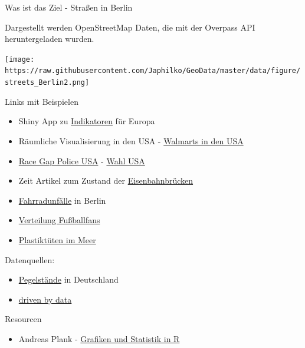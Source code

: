 \documentclass[ignorenonframetext,]{beamer}
\providecommand{\tightlist}{%
  \setlength{\itemsep}{0pt}\setlength{\parskip}{0pt}}
\begin{document}
\begin{frame}{Was ist das Ziel - Straßen in Berlin}
\protect\hypertarget{was-ist-das-ziel---straen-in-berlin}{}

Dargestellt werden OpenStreetMap Daten, die mit der Overpass API
heruntergeladen wurden.

\texttt{[image: https://raw.githubusercontent.com/Japhilko/GeoData/master/data/figure/streets\_Berlin2.png]}

\end{frame}

\begin{frame}{Links mit Beispielen}
\protect\hypertarget{links-mit-beispielen}{}

\begin{itemize}
\item
  Shiny App zu
  \href{https://japhilko.shinyapps.io/Choropleths/}{Indikatoren} für
  Europa
\item
  Räumliche Visualisierung in den USA -
  \href{https://rpubs.com/Radcliffe/walmart}{Walmarts in den USA}
\item
  \href{http://www.nytimes.com/interactive/2014/09/03/us/the-race-gap-in-americas-police-departments.html?_r=0}{Race
  Gap Police USA} - \href{http://fivethirtyeight.com/}{Wahl USA}
\item
  Zeit Artikel zum Zustand der
  \href{http://detektor.fm/digital/datenjournalismus-interaktive-karte-zeigt-marode-deutsche-bahn-bruecken}{Eisenbahnbrücken}
\item
  \href{http://michael-hoerz.de/maps/berlin-bike/}{Fahrradunfälle} in
  Berlin
\item
  \href{http://interaktiv.morgenpost.de/beta-fussballkarte/\#7/51.258/10.756}{Verteilung
  Fußballfans}
\item
  \href{http://news.nationalgeographic.com/news/2014/07/140715-ocean-plastic-debris-trash-pacific-garbage-patch/}{Plastiktüten
  im Meer}
\end{itemize}

Datenquellen:

\begin{itemize}
\tightlist
\item
  \href{https://www.pegelonline.wsv.de/gast/start}{Pegelstände} in
  Deutschland
\item
  \href{http://driven-by-data.net/}{driven by data}
\end{itemize}

Resourcen

\begin{itemize}
\tightlist
\item
  Andreas Plank -
  \href{http://www.chironomidaeproject.com/fileadmin/downloads/Formeln_in_R.pdf}{Grafiken
  und Statistik in R}
\end{itemize}

\end{frame}
\end{document}
